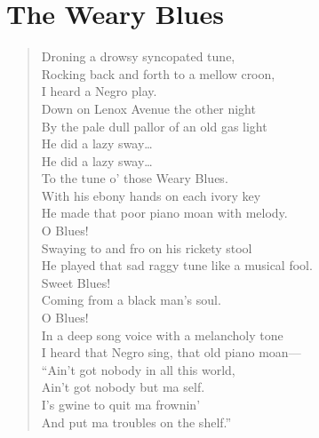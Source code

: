 \chapter{The Weary Blues}
\begin{verse}
Droning a drowsy syncopated tune,\\\empty{}
Rocking back and forth to a mellow croon,\\\empty{}
\hspace{2em}I heard a Negro play.\\\empty{}
Down on Lenox Avenue the other night\\\empty{}
By the pale dull pallor of an old gas light\\\empty{}
\hspace{2em}He did a lazy sway\ldots{}\\\empty{}
\hspace{2em}He did a lazy sway\ldots{}\\\empty{}
To the tune o' those Weary Blues.\\\empty{}
With his ebony hands on each ivory key\\\empty{}
He made that poor piano moan with melody.\\\empty{}
\hspace{2em}O Blues!\\\empty{}
Swaying to and fro on his rickety stool\\\empty{}
He played that sad raggy tune like a musical fool.\\\empty{}
\hspace{2em}Sweet Blues!\\\empty{}
Coming from a black man's soul.\\\empty{}
\hspace{2em}O Blues!\\\empty{}
In a deep song voice with a melancholy tone\\\empty{}
I heard that Negro sing, that old piano moan—\\\empty{}
\hspace{1.5em}``Ain't got nobody in all this world,\\\empty{}
\hspace{2em}Ain't got nobody but ma self.\\\empty{}
\hspace{2em}I’s gwine to quit ma frownin'\\\empty{}
\hspace{2em}And put ma troubles on the shelf.''\\\empty{}

\end{verse}
